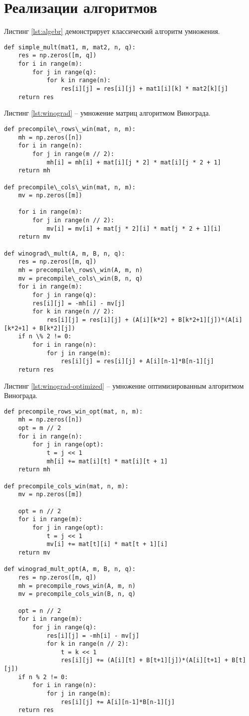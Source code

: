 \section{Реализации алгоритмов}
Листинг \ref{lst:algebr} демонстрирует классический алгоритм умножения. 


\captionsetup{singlelinecheck = false, justification=raggedright}
\begin{lstlisting}[label=lst:algebr,caption=Классический алгоритм умножения]
def simple_mult(mat1, m, mat2, n, q):
	res = np.zeros([m, q])
	for i in range(m):
		for j in range(q):
			for k in range(n):
				res[i][j] = res[i][j] + mat1[i][k] * mat2[k][j]
	return res
\end{lstlisting}

\newpage
Листинг \ref{lst:winograd} -- умножение матриц алгоритмом Винограда.

\begin{lstlisting}[label=lst:winograd,caption=Алгоритм умнложения Виноградом]
def precompile\_rows\_win(mat, n, m):
	mh = np.zeros([n])
	for i in range(n):
		for j in range(m // 2):
			mh[i] = mh[i] + mat[i][j * 2] * mat[i][j * 2 + 1]
	return mh

def precompile\_cols\_win(mat, n, m):
	mv = np.zeros([m])
	
	for i in range(m):
		for j in range(n // 2):
			mv[i] = mv[i] + mat[j * 2][i] * mat[j * 2 + 1][i]
	return mv

def winograd\_mult(A, m, B, n, q):
	res = np.zeros([m, q])
	mh = precompile\_rows\_win(A, m, n)
	mv = precompile\_cols\_win(B, n, q)
	for i in range(m):
		for j in range(q):
		res[i][j] = -mh[i] - mv[j]
		for k in range(n // 2):
			res[i][j] = res[i][j] + (A[i][k*2] + B[k*2+1][j])*(A[i][k*2+1] + B[k*2][j])
	if n \% 2 != 0:
		for i in range(n):
			for j in range(m):
				res[i][j] = res[i][j] + A[i][n-1]*B[n-1][j]
	return res

\end{lstlisting}	

\newpage
Листинг \ref{lst:winograd-optimized} -- умножение оптимизированным алгоритмом Винограда.
\begin{lstlisting}[label=lst:winograd-optimized,caption=Оптимизированный алгоритм умножения Виноградом]
def precompile_rows_win_opt(mat, n, m):
	mh = np.zeros([n])
	opt = m // 2
	for i in range(n):
		for j in range(opt):
			t = j << 1
			mh[i] += mat[i][t] * mat[i][t + 1]
	return mh

def precompile_cols_win(mat, n, m):
	mv = np.zeros([m])
	
	opt = n // 2
	for i in range(m):
		for j in range(opt):
			t = j << 1
			mv[i] += mat[t][i] * mat[t + 1][i]
	return mv

def winograd_mult_opt(A, m, B, n, q):
	res = np.zeros([m, q])
	mh = precompile_rows_win(A, m, n)
	mv = precompile_cols_win(B, n, q)
	
	opt = n // 2
	for i in range(m):
		for j in range(q):
			res[i][j] = -mh[i] - mv[j]
			for k in range(n // 2):
				t = k << 1
				res[i][j] += (A[i][t] + B[t+1][j])*(A[i][t+1] + B[t][j])
	if n % 2 != 0:
		for i in range(n):
			for j in range(m):
				res[i][j] += A[i][n-1]*B[n-1][j]
	return res
\end{lstlisting}


